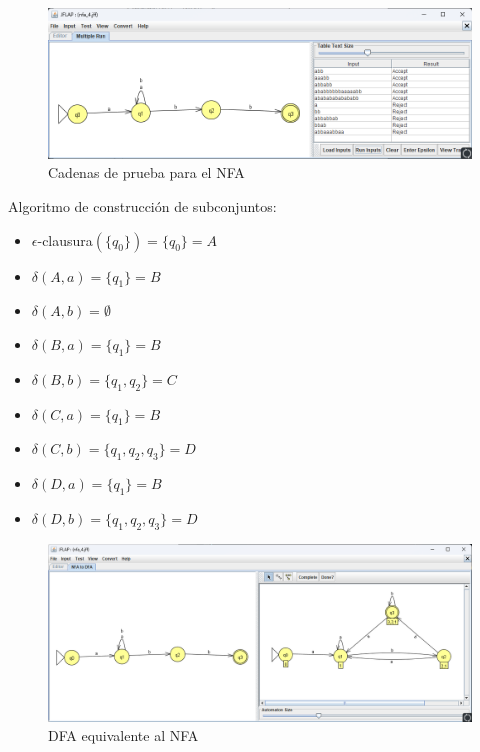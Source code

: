\documentclass[11pt]{report}
\begin{document}
\begin{figure}[H]
  \centering
  \includegraphics[scale=0.55]{img/NFA_04_test.png}
  \caption{Cadenas de prueba para el NFA}
\end{figure}

\newpage

Algoritmo de construcción de subconjuntos:
\begin{multicols}{2}
  \begin{itemize}
    \item $\epsilon$-clausura$(\{q_0\}) = \{q_0\} = A$
    \item $\delta(A, a) = \{q_1\} = B$
    \item $\delta(A, b) = \emptyset$
    \item $\delta(B, a) = \{q_1\} = B$
    \item $\delta(B, b) = \{q_1, q_2\} = C$
  \end{itemize}

  \columnbreak

  \begin{itemize}
    \item $\delta(C, a) = \{q_1\} = B$
    \item $\delta(C, b) = \{q_1, q_2, q_3\} = D$
    \item $\delta(D, a) = \{q_1\} = B$
    \item $\delta(D, b) = \{q_1, q_2, q_3\} = D$
  \end{itemize}  
\end{multicols}

\begin{figure}[H]
  \centering
  \includegraphics[scale=0.4]{img/NFA_to_DFA_04.png}
  \caption{DFA equivalente al NFA}
\end{figure}
\end{document}
